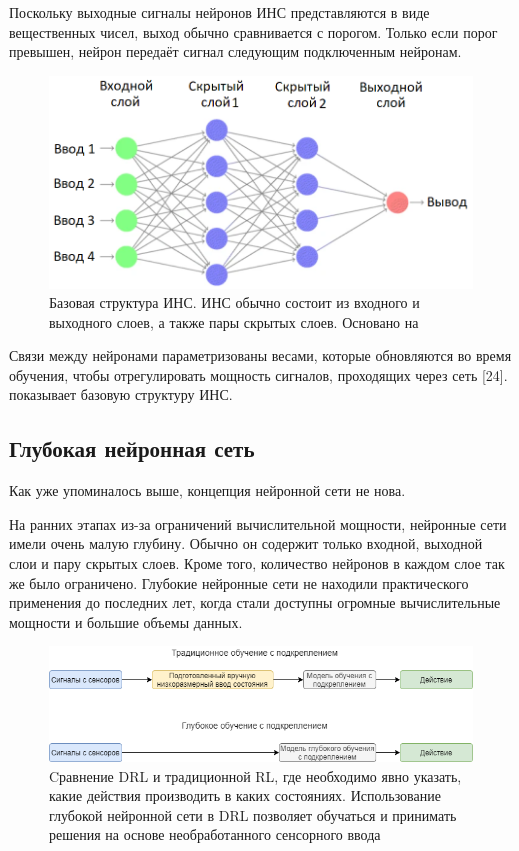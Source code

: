 Поскольку выходные сигналы нейронов ИНС представляются в виде вещественных чисел, выход обычно сравнивается с порогом. Только если порог превышен, нейрон передаёт сигнал следующим подключенным нейронам. 

\begin{figure}[ht!] 
	\center
	\includegraphics [scale=0.60] {my_folder/images/ch1/ANN.png}
	\caption{Базовая структура ИНС. ИНС обычно состоит из входного и выходного слоев, а также пары скрытых слоев. Основано на \cite{Khajanchi2003ArtificialNN} \cite{mitchell1997machine}} 
	\label{fig:ch1-ANN}
\end{figure}

Связи между нейронами параметризованы весами, которые обновляются во время обучения, чтобы отрегулировать мощность сигналов, проходящих через сеть [24].  показывает базовую структуру ИНС.


\subsection{Глубокая нейронная сеть}

Как уже упоминалось выше, концепция нейронной сети не нова.

На ранних этапах из-за ограничений вычислительной мощности, нейронные сети имели очень малую глубину. Обычно он содержит только входной, выходной слои и пару скрытых слоев. Кроме того, количество нейронов в каждом слое так же было ограничено. Глубокие нейронные сети не находили практического применения до последних лет, когда стали доступны огромные вычислительные мощности и большие объемы данных.

\begin{figure}[ht!] 
	\center
	\includegraphics [scale=0.65] {my_folder/images/ch1/DRL-flow.png}
	\caption{Cравнение DRL и традиционной RL, где необходимо явно указать, какие действия производить в каких состояниях. Использование глубокой нейронной сети в DRL позволяет обучаться и принимать решения на основе необработанного сенсорного ввода} 
	\label{fig:DRL-flow}
\end{figure}


